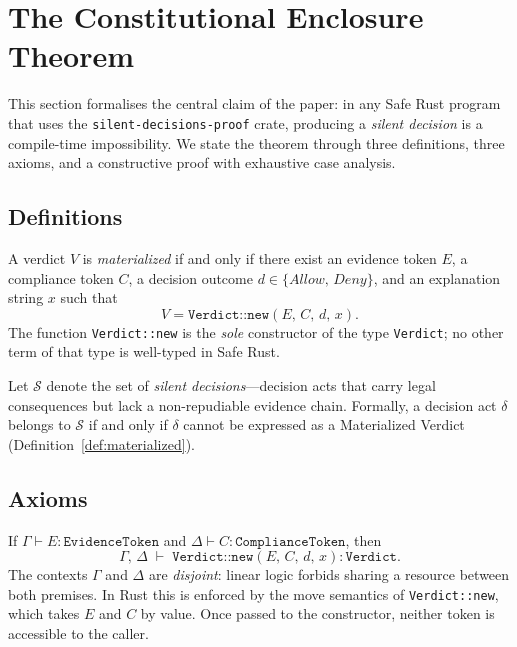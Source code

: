 
\section{The Constitutional Enclosure Theorem}
\label{sec:theorem}

This section formalises the central claim of the paper: in any Safe Rust
program that uses the \texttt{silent-decisions-proof} crate, producing a
\emph{silent decision} is a compile-time impossibility.  We state the
theorem through three definitions, three axioms, and a constructive proof
with exhaustive case analysis.

\subsection{Definitions}
\label{sec:definitions}

\begin{definition}
\label{def:materialized}
A verdict $V$ is \emph{materialized} if and only if there exist an
evidence token $E$, a compliance token $C$, a decision outcome
$d \in \{\mathit{Allow},\, \mathit{Deny}\}$, and an explanation string
$x$ such that
\[
  V = \texttt{Verdict::new}(E,\, C,\, d,\, x).
\]
The function \texttt{Verdict::new} is the \emph{sole} constructor of
the type \texttt{Verdict}; no other term of that type is well-typed in
Safe Rust.
\end{definition}

\begin{definition}
\label{def:silent}
Let $\mathcal{S}$ denote the set of \emph{silent decisions}---decision
acts that carry legal consequences but lack a non-repudiable evidence
chain.  Formally, a decision act $\delta$ belongs to $\mathcal{S}$ if
and only if $\delta$ cannot be expressed as a Materialized Verdict
(Definition~\ref{def:materialized}).
\end{definition}

\subsection{Axioms}
\label{sec:axioms}

\begin{axiom}
\label{ax:intro}
If $\Gamma \vdash E : \texttt{EvidenceToken}$ and
$\Delta \vdash C : \texttt{ComplianceToken}$, then
\[
  \Gamma,\, \Delta \;\vdash\; \texttt{Verdict::new}(E,\, C,\, d,\, x)
  : \texttt{Verdict}.
\]
The contexts $\Gamma$ and $\Delta$ are \emph{disjoint}: linear logic
forbids sharing a resource between both premises.  In Rust this is
enforced by the move semantics of \texttt{Verdict::new}, which takes
$E$ and $C$ by value.  Once passed to the constructor, neither token
is accessible to the caller.
\end{axiom}

